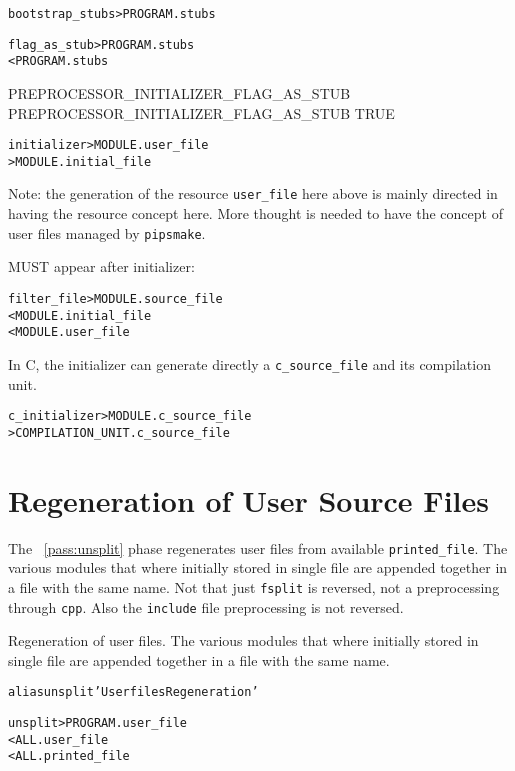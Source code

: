 \documentclass[a4paper]{report}
\newenvironment{PipsMake}{\begin{alltt}}{\end{alltt}}
\newcommand{\PipsPassRef}[1]{\texttt{\detokenize{#1}}~\ref{pass:#1}}
\newenvironment{PipsPass}[1]{\label{pass:#1}}{}
\newcommand{\Pipsmake}{\texttt{pipsmake}}
\begin{document}
\begin{PipsMake}
bootstrap_stubs > PROGRAM.stubs
\end{PipsMake}

\begin{PipsMake}
flag_as_stub                     > PROGRAM.stubs
                < PROGRAM.stubs
\end{PipsMake}

\begin{PipsProp}{PREPROCESSOR_INITIALIZER_FLAG_AS_STUB}
PREPROCESSOR_INITIALIZER_FLAG_AS_STUB TRUE
\end{PipsProp}


\begin{PipsMake}
initializer                     > MODULE.user_file
                                > MODULE.initial_file
\end{PipsMake}


Note: the generation of the resource \verb|user_file| here above is mainly
directed in having the resource concept here. More thought is needed to
have the concept of user files managed by \Pipsmake{}.

MUST appear after initializer:

\begin{PipsMake}
filter_file                     > MODULE.source_file
                < MODULE.initial_file
                < MODULE.user_file
\end{PipsMake}


In C, the initializer can generate directly a \verb|c_source_file| and
its compilation unit.

\begin{PipsMake}
c_initializer                     > MODULE.c_source_file
                                  > COMPILATION_UNIT.c_source_file
\end{PipsMake}


\section{Regeneration of User Source Files}
\label{sec:regen-user-source}


The \PipsPassRef{unsplit} phase regenerates user files from available
\verb|printed_file|. The various modules that where initially stored in
single file are appended together in a file with the same name. Not that
just \texttt{fsplit} is reversed, not a preprocessing through \texttt{cpp}.
Also the \texttt{include} file preprocessing is not reversed.


\begin{PipsPass}{unsplit}
Regeneration of user files. The various modules that where initially stored in
single file are appended together in a file with the same name.
\end{PipsPass}
\begin{PipsMake}

alias unsplit 'User files Regeneration'

unsplit                         > PROGRAM.user_file
                < ALL.user_file
                < ALL.printed_file
\end{PipsMake}
\end{document}
